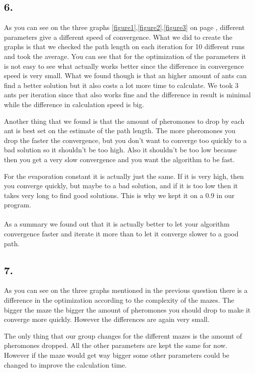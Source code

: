 \documentclass{scrartcl}
\begin{document}
\subsection*{6.}
As you can see on the three graphs \ref{figure1},\ref{figure2},\ref{figure3} on page \pageref{figure3}, different parameters give a different speed of convergence. What we did to create the graphs is that we checked the path length on each iteration for 10 different runs and took the average. You can see that for the optimization of the parameters it is not easy to see what actually works better since the difference in convergence speed is very small. What we found though is that an higher amount of ants can find a better solution but it also costs a lot more time to calculate. We took 3 ants per iteration since that also works fine and the difference in result is minimal while the difference in calculation speed is big.\par
Another thing that we found is that the amount of pheromones to drop by each ant is best set on the estimate of the path length. The more pheromones you drop the faster the convergence, but you don't want to converge too quickly to a bad solution so it shouldn't be too high. Also it shouldn't be too low because then you get a very slow convergence and you want the algorithm to be fast. \par
For the evaporation constant it is actually just the same. If it is very high, then you converge quickly, but maybe to a bad solution, and if it is too low then it takes very long to find good solutions. This is why we kept it on a 0.9 in our program.\\
\\
As a summary we found out that it is actually better to let your algorithm convergence faster and iterate it more than to let it converge slower to a good path.
\subsection*{7.}

As you can see on the three graphs mentioned in the previous question there is a difference in the optimization according to the complexity of the mazes. The bigger the maze the bigger the amount of pheromones you should drop to make it converge more quickly. However the differences are again very small. \par
The only thing that our group changes for the different mazes is the amount of pheromones dropped. All the other parameters are kept the same for now. However if the maze would get way bigger some other parameters could be changed to improve the calculation time.
\end{document}
